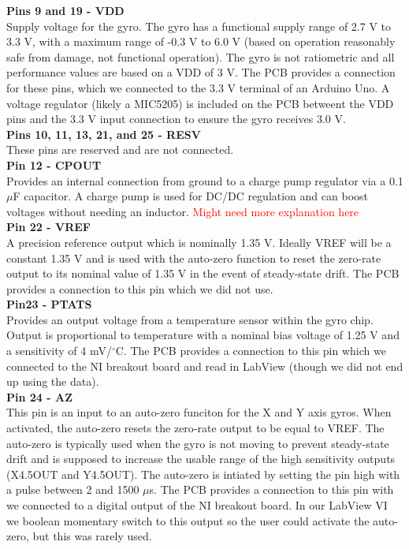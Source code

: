 \documentclass{article}
\newcommand{\xxx}[1]{\textcolor{red}{#1}}
\theoremstyle{plain}
\theoremstyle{definition}
\theoremstyle{remark}
\begin{document}
\textbf{Pins 9 and 19 - VDD}\\
Supply voltage for the gyro. The gyro has a functional supply range of 2.7 V to 3.3 V, with a maximum range of -0.3 V to 6.0 V (based on operation reasonably safe from damage, not functional operation). The gyro is not ratiometric and all performance values are based on a VDD of 3 V. The PCB provides a connection for these pins, which we connected to the 3.3 V terminal of an Arduino Uno. A voltage regulator (likely a MIC5205) is included on the PCB betweent the VDD pins and the 3.3 V input connection to ensure the gyro receives 3.0 V. \\ 

\textbf{Pins 10, 11, 13, 21, and 25 - RESV}\\
These pins are reserved and are not connected.\\

\textbf{Pin 12 - CPOUT}\\
Provides an internal connection from ground to a charge pump regulator via a 0.1 $\mu$F capacitor. A charge pump is used for DC/DC regulation and can boost voltages without needing an inductor. \xxx{Might need more explanation here}\\

\textbf{Pin 22 - VREF}\\
A precision reference output which is nominally 1.35 V. Ideally VREF will be a constant 1.35 V and is used with the auto-zero function to reset the zero-rate output to its nominal value of 1.35 V in the event of steady-state drift. The PCB provides a connection to this pin which we did not use.\\

\textbf{Pin23 - PTATS}\\
Provides an output voltage from a temperature sensor within the gyro chip. Output is proportional to temperature with a nominal bias voltage of 1.25 V and a sensitivity of 4 mV/$^{\circ}$C. The PCB provides a connection to this pin which we connected to the NI breakout board and read in LabView (though we did not end up using the data).\\

\textbf{Pin 24 - AZ}\\
This pin is an input to an auto-zero funciton for the X and Y axis gyros. When activated, the auto-zero resets the zero-rate output to be equal to VREF. The auto-zero is typically used when the gyro is not moving to prevent steady-state drift and is supposed to increase the usable range of the high sensitivity outputs (X4.5OUT and Y4.5OUT). The auto-zero is intiated by setting the pin high with a pulse between 2 and 1500 $\mu$s. The PCB provides a connection to this pin with we connected to a digital output of the NI breakout board. In our LabView VI we boolean momentary switch to this output so the user could activate the auto-zero, but this was rarely used.\\ 
\end{document}
